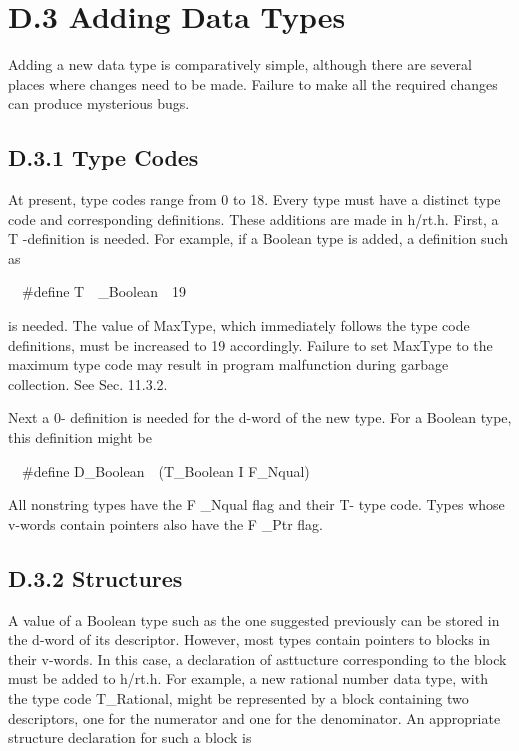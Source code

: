 \section[D.3 Adding Data Types]{D.3 Adding Data Types}

Adding a new data type is comparatively simple, although there are
several places where changes need to be made. Failure to make all the
required changes can produce mysterious bugs.

\subsection{D.3.1 Type Codes}

At present, type codes range from 0 to 18. Every type must have a
distinct type code and corresponding definitions.  These additions are
made in h/rt.h. First, a T -definition is needed. For example, if a
Boolean type is added, a definition such as

{\ttfamily\mdseries
\ \ \#define T\ \ \_Boolean\ \ 19}

\noindent is needed. The value of MaxType, which immediately follows
the type code definitions, must be increased to 19 accordingly.
Failure to set MaxType to the maximum type code may result in
program malfunction during garbage collection. See Sec. 11.3.2.

Next a 0- definition is needed for the d-word of the new type. For a
Boolean type, this definition might be

{\ttfamily\mdseries
\ \ \#define D\_Boolean\ \ (T\_Boolean I F\_Nqual)}

All nonstring types have the F \_Nqual flag and their T- type
code. Types whose v-words contain pointers also have the F \_Ptr flag.

\subsection{D.3.2 Structures}

A value of a Boolean type such as the one suggested previously can be
stored in the d-word of its descriptor. However, most types contain
pointers to blocks in their v-words. In this case, a declaration of
asttucture corresponding to the block must be added to h/rt.h. For
example, a new rational number data type, with the type code
T\_Rational, might be represented by a block containing two
descriptors, one for the numerator and one for the denominator. An
appropriate structure declaration for such a block is

